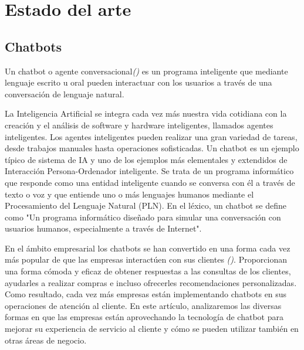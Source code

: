 \chapter{Estado del arte}

\section{Chatbots}

Un chatbot o agente conversacional\textit{(\cite{chatbots2020})} es un programa inteligente que mediante lenguaje escrito u oral pueden interactuar con los usuarios a través de una conversación de lenguaje natural. 

La Inteligencia Artificial se integra cada vez más nuestra vida cotidiana con la creación y el análisis de software y hardware inteligentes, llamados agentes inteligentes. Los agentes inteligentes pueden realizar una gran variedad de tareas, desde trabajos manuales hasta operaciones sofisticadas. Un chatbot es un ejemplo típico de sistema de IA y uno de los ejemplos más elementales y extendidos de Interacción Persona-Ordenador inteligente. Se trata de un programa informático que responde como una entidad inteligente cuando se conversa con él a través de texto o voz y que entiende uno o más lenguajes humanos mediante el Procesamiento del Lenguaje Natural (PLN). En el léxico, un chatbot se define como "Un programa informático diseñado para simular una conversación con usuarios humanos, especialmente a través de Internet".

En el ámbito empresarial los chatbots se han convertido en una forma cada vez más popular de que las empresas interactúen con sus clientes \textit{(\cite{techinnovation})}. Proporcionan una forma cómoda y eficaz de obtener respuestas a las consultas de los clientes, ayudarles a realizar compras e incluso ofrecerles recomendaciones personalizadas. Como resultado, cada vez más empresas están implementando chatbots en sus operaciones de atención al cliente. En este artículo, analizaremos las diversas formas en que las empresas están aprovechando la tecnología de chatbot para mejorar su experiencia de servicio al cliente y cómo se pueden utilizar también en otras áreas de negocio.

